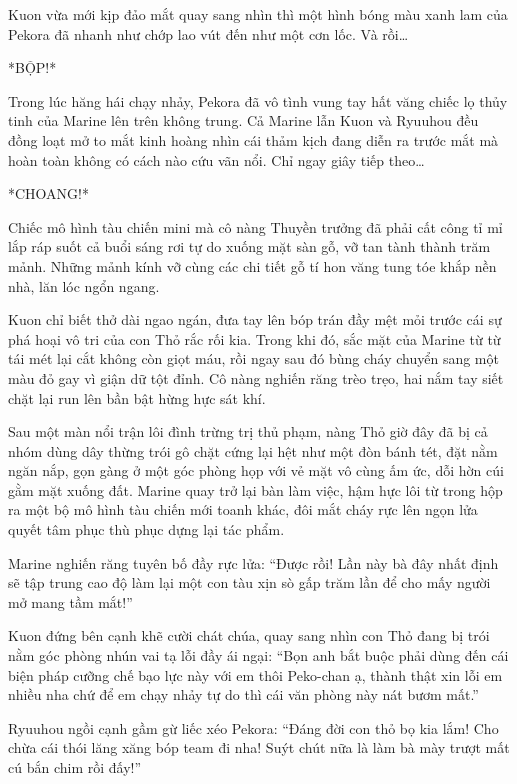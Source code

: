 \documentclass[../main.tex]{subfiles}
\begin{document}
Kuon vừa mới kịp đảo mắt quay sang nhìn thì một hình bóng màu xanh lam của Pekora đã nhanh như chớp lao vút đến như một cơn lốc. Và rồi\dots


*BỘP!*

Trong lúc hăng hái chạy nhảy, Pekora đã vô tình vung tay hất văng chiếc lọ thủy tinh của Marine lên trên không trung. Cả Marine lẫn Kuon và Ryuuhou đều đồng loạt mở to mắt kinh hoàng nhìn cái thảm kịch đang diễn ra trước mắt mà hoàn toàn không có cách nào cứu vãn nổi. Chỉ ngay giây tiếp theo\dots

*CHOANG!*

Chiếc mô hình tàu chiến mini mà cô nàng Thuyền trưởng đã phải cất công tỉ mỉ lắp ráp suốt cả buổi sáng rơi tự do xuống mặt sàn gỗ, vỡ tan tành thành trăm mảnh. Những mảnh kính vỡ cùng các chi tiết gỗ tí hon văng tung tóe khắp nền nhà, lăn lóc ngổn ngang.

Kuon chỉ biết thở dài ngao ngán, đưa tay lên bóp trán đầy mệt mỏi trước cái sự phá hoại vô tri của con Thỏ rắc rối kia. Trong khi đó, sắc mặt của Marine từ từ tái mét lại cắt không còn giọt máu, rồi ngay sau đó bùng cháy chuyển sang một màu đỏ gay vì giận dữ tột đỉnh. Cô nàng nghiến răng trèo trẹo, hai nắm tay siết chặt lại run lên bần bật hừng hực sát khí.

\ct


Sau một màn nổi trận lôi đình trừng trị thủ phạm, nàng Thỏ giờ đây đã bị cả nhóm dùng dây thừng trói gô chặt cứng lại hệt như một đòn bánh tét, đặt nằm ngăn nắp, gọn gàng ở một góc phòng họp với vẻ mặt vô cùng ấm ức, dỗi hờn cúi gằm mặt xuống đất. Marine quay trở lại bàn làm việc, hậm hực lôi từ trong hộp ra một bộ mô hình tàu chiến mới toanh khác, đôi mắt cháy rực lên ngọn lửa quyết tâm phục thù phục dựng lại tác phẩm.

Marine nghiến răng tuyên bố đầy rực lửa: ``Được rồi! Lần này bà đây nhất định sẽ tập trung cao độ làm lại một con tàu xịn sò gấp trăm lần để cho mấy người mở mang tầm mắt!''

Kuon đứng bên cạnh khẽ cười chát chúa, quay sang nhìn con Thỏ đang bị trói nằm góc phòng nhún vai tạ lỗi đầy ái ngại: ``Bọn anh bắt buộc phải dùng đến cái biện pháp cưỡng chế bạo lực này với em thôi Peko-chan ạ, thành thật xin lỗi em nhiều nha chứ để em chạy nhảy tự do thì cái văn phòng này nát bươm mất.''

Ryuuhou ngồi cạnh gầm gừ liếc xéo Pekora: ``Đáng đời con thỏ bọ kia lắm! Cho chừa cái thói lăng xăng bóp team đi nha! Suýt chút nữa là làm bà mày trượt mất cú bắn chim rồi đấy!''
\end{document}
